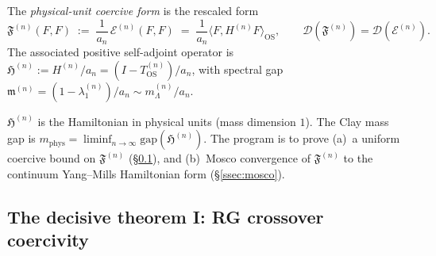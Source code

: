 \begin{definition}
\label{def:phys_coercive}
The \emph{physical-unit coercive form} is the rescaled form
\begin{equation}
\label{eq:Fn_def}
  \mathfrak{F}^{(n)}(F,F)
  \;:=\;\frac{1}{a_{n}}\,\mathcal{E}^{(n)}(F,F)
  \;=\;\frac{1}{a_{n}}\langle F,H^{(n)}F\rangle_{\mathrm{OS}},
  \qquad
  \mathcal{D}(\mathfrak{F}^{(n)})=\mathcal{D}(\mathcal{E}^{(n)}).
\end{equation}
The associated positive self-adjoint operator is
$\mathfrak{H}^{(n)}:=H^{(n)}/a_{n}=(I-T_{\mathrm{OS}}^{(n)})/a_{n}$,
with spectral gap
$\mathfrak{m}^{(n)}=(1-\lambda_{1}^{(n)})/a_{n}\sim
m_{\Lambda}^{(n)}/a_{n}$.
\end{definition}

\begin{remark}
\label{rem:phys_meaning}
$\mathfrak{H}^{(n)}$ is the Hamiltonian in physical units
(mass dimension $1$). The Clay mass gap is
$m_{\mathrm{phys}}=\liminf_{n\to\infty}\mathrm{gap}(\mathfrak{H}^{(n)})$.
The program is to prove
(a)~a uniform coercive bound on $\mathfrak{F}^{(n)}$
(\S\ref{ssec:rg_crossover}), and
(b)~Mosco convergence of $\mathfrak{F}^{(n)}$ to the continuum
Yang--Mills Hamiltonian form (\S\ref{ssec:mosco}).
\end{remark}

\subsection{The decisive theorem I: RG crossover coercivity}
\label{ssec:rg_crossover}

